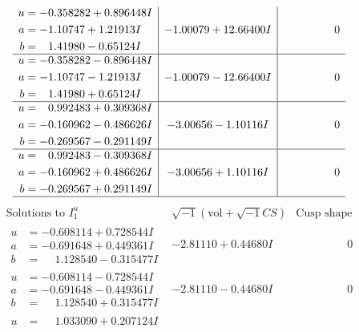 \documentclass[1p]{elsarticle_modified}
\theoremstyle{definition}
\newcommand{\I}{\sqrt{-1}}
\begin{document}
$$\begin{array}{c|c|c}
\begin{aligned}
u &= -0.358282 + 0.896448 I \\
a &= -1.10747 + 1.21913 I \\
b &= \phantom{-}1.41980 - 0.65124 I\end{aligned}
 & -1.00079 + 12.66400 I & \phantom{-0.000000 } 0 \\ \hline\begin{aligned}
u &= -0.358282 - 0.896448 I \\
a &= -1.10747 - 1.21913 I \\
b &= \phantom{-}1.41980 + 0.65124 I\end{aligned}
 & -1.00079 - 12.66400 I & \phantom{-0.000000 } 0 \\ \hline\begin{aligned}
u &= \phantom{-}0.992483 + 0.309368 I \\
a &= -0.160962 - 0.486626 I \\
b &= -0.269567 - 0.291149 I\end{aligned}
 & -3.00656 - 1.10116 I & \phantom{-0.000000 } 0 \\ \hline\begin{aligned}
u &= \phantom{-}0.992483 - 0.309368 I \\
a &= -0.160962 + 0.486626 I \\
b &= -0.269567 + 0.291149 I\end{aligned}
 & -3.00656 + 1.10116 I & \phantom{-0.000000 } 0\\
 \hline 
 \end{array}$$\newpage$$\begin{array}{c|c|c}  
\text{Solutions to }I^u_{1}& \I (\text{vol} + \sqrt{-1}CS) & \text{Cusp shape}\\
 \hline 
\begin{aligned}
u &= -0.608114 + 0.728544 I \\
a &= -0.691648 + 0.449361 I \\
b &= \phantom{-}1.128540 - 0.315477 I\end{aligned}
 & -2.81110 + 0.44680 I & \phantom{-0.000000 } 0 \\ \hline\begin{aligned}
u &= -0.608114 - 0.728544 I \\
a &= -0.691648 - 0.449361 I \\
b &= \phantom{-}1.128540 + 0.315477 I\end{aligned}
 & -2.81110 - 0.44680 I & \phantom{-0.000000 } 0 \\ \hline\begin{aligned}
u &= \phantom{-}1.033090 + 0.207124 I \\

\end{aligned}
\end{array}$$
\end{document}

